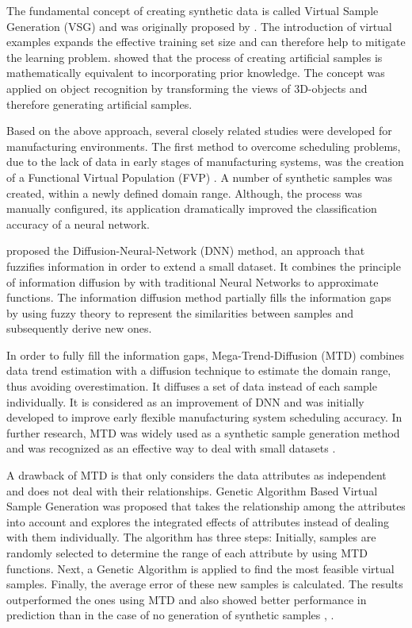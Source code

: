 \documentclass[10pt,letterpaper]{article}
\begin{document}
The fundamental concept of creating synthetic data is called Virtual Sample Generation (VSG) and was originally proposed by \cite{Niyogi.1998}. The introduction of virtual examples expands the effective training set size and can therefore help to mitigate the learning problem. \cite{Niyogi.1998} showed that the process of creating artificial samples is mathematically equivalent to incorporating prior knowledge. The concept was applied on object recognition by transforming the views of 3D-objects and therefore generating artificial samples.

Based on the above approach, several closely related studies were developed for manufacturing environments. The first method to overcome scheduling problems, due to the lack of data in early stages of manufacturing systems, was the creation of a Functional Virtual Population (FVP) \cite{Li.2003}. A number of synthetic samples was created, within a newly defined domain range. Although, the process was manually configured, its application dramatically improved the classification accuracy of a neural network. 

\cite{Huang.2004} proposed the Diffusion-Neural-Network (DNN) method, an approach that fuzzifies information in order to extend a small dataset. It combines the principle of information diffusion by \cite{Huang.1997} with traditional Neural Networks to approximate functions. The information diffusion method partially fills the information gaps by using fuzzy theory to represent the similarities between samples and subsequently derive new ones.

In order to fully fill the information gaps, Mega-Trend-Diffusion (MTD) \cite{Li.2007} combines data trend estimation with a diffusion technique to estimate the domain range, thus avoiding overestimation. It diffuses a set of data instead of each sample individually. It is considered as an improvement of DNN and was initially developed to improve early flexible manufacturing system scheduling accuracy. In further research, MTD was widely used as a synthetic sample generation method and was recognized as an effective way to deal with small datasets \cite{AbdulLateh.2017}.

A drawback of MTD is that only considers the data attributes as independent and does not deal with their relationships. Genetic Algorithm Based Virtual Sample Generation was proposed that takes the relationship among the attributes into account and explores the integrated effects of attributes instead of dealing with them individually. The algorithm has three steps: Initially, samples are randomly selected to determine the range of each attribute by using MTD functions. Next, a Genetic Algorithm is applied to find the most feasible virtual samples. Finally, the average error of these new samples is calculated. The results outperformed the ones using MTD and also showed better performance in prediction than in the case of no generation of synthetic samples \cite{Li.2014}, \cite{Lin.2010}.
\end{document}
